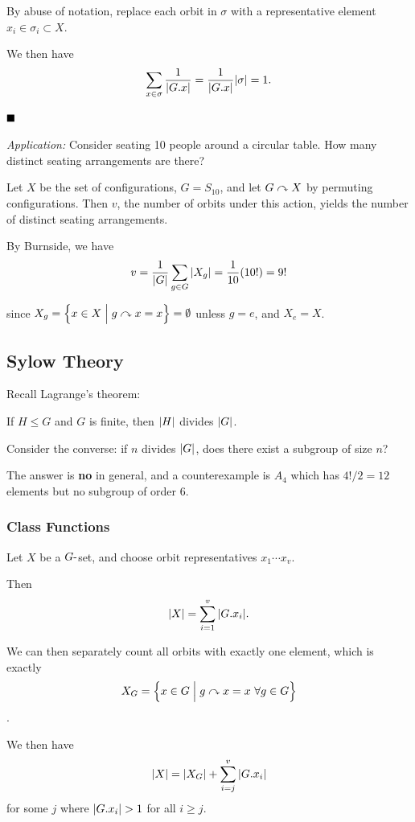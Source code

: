 By abuse of notation, replace each orbit in \(\sigma\) with a
representative element \(x_i\in \sigma_i \subset X\).

We then have \[
\sum_{x \in \sigma} \frac{1}{{\left\lvert {G.x} \right\rvert}} = \frac{1}{{\left\lvert {G.x} \right\rvert}} {\left\lvert {\sigma} \right\rvert}  = 1.
\]

\(\qed\)

\emph{Application:} Consider seating 10 people around a circular table.
How many distinct seating arrangements are there?

Let \(X\) be the set of configurations, \(G = S_{10}\), and let
\(G\curvearrowright X\) by permuting configurations. Then \(v\), the number of
orbits under this action, yields the number of distinct seating
arrangements.

By Burnside, we have \[
v = \frac{1}{{\left\lvert {G} \right\rvert}} \sum_{g\in G} {\left\lvert {X_g} \right\rvert} = \frac{1}{10} (10!) = 9!
\]

since \(X_g = \left\{{x\in X \mathrel{\Big|} g\curvearrowright x = x}\right\} = \emptyset\) unless
\(g = e\), and \(X_e = X\).

\hypertarget{sylow-theory}{%
\subsection{Sylow Theory}\label{sylow-theory}}

Recall Lagrange's theorem:

If \(H \leq G\) and \(G\) is finite, then \({\left\lvert {H} \right\rvert}\) divides
\({\left\lvert {G} \right\rvert}\).

Consider the converse: if \(n\) divides \({\left\lvert {G} \right\rvert}\), does there exist a
subgroup of size \(n\)?

The answer is \textbf{no} in general, and a counterexample is \(A_4\)
which has \(4!/2 = 12\) elements but no subgroup of order 6.

\hypertarget{class-functions}{%
\subsubsection{Class Functions}\label{class-functions}}

Let \(X\) be a \(G{\hbox{-}}\)set, and choose orbit representatives
\(x_1 \cdots x_v\).

Then \[
{\left\lvert {X} \right\rvert} = \sum_{i=1}^v {\left\lvert {G .x_i} \right\rvert}.
\]

We can then separately count all orbits with exactly one element, which
is exactly \[
X_G = \left\{{x\in G \mathrel{\Big|} g\curvearrowright x = x ~ \forall g\in G}\right\}
\].

We then have \[
{\left\lvert {X} \right\rvert} = {\left\lvert {X_G} \right\rvert} + \sum_{i=j}^v {\left\lvert {G. x_i} \right\rvert}
\] for some \(j\) where \({\left\lvert {G.x_i} \right\rvert} > 1\) for all \(i \geq j\).

